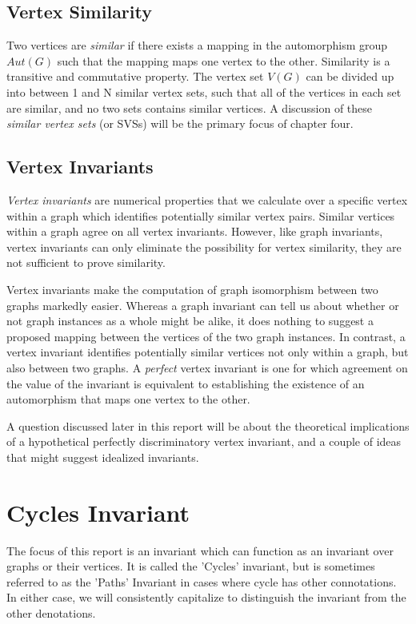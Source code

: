 \documentclass[11pt,a4paper]{report}
\begin{document}
\subsection{Vertex Similarity}
Two vertices are \emph{similar} if there exists a mapping in the automorphism group $Aut(G)$ such that the mapping maps one vertex to the other.
Similarity is a transitive and commutative property.
The vertex set $V(G)$ can be divided up into between 1 and N similar vertex sets, such that all of the vertices in each set are similar, and no two sets contains similar vertices.
A discussion of these \emph{similar vertex sets} (or SVSs) will be the primary focus of chapter four.

\subsection{Vertex Invariants}
\emph{Vertex invariants} are numerical properties that we  calculate over a specific vertex within a graph which identifies potentially similar vertex pairs.
Similar vertices within a graph agree on all vertex invariants.
However, like graph invariants, vertex invariants can only eliminate the possibility for vertex similarity, they are not sufficient to prove similarity.

Vertex invariants make the computation of graph isomorphism between two graphs markedly easier. 
Whereas a graph invariant can tell us about whether or not graph instances as a whole might be alike, it does nothing to suggest a proposed mapping between the vertices of the two graph instances.
In contrast, a vertex invariant identifies potentially similar vertices not only within a graph, but also between two graphs.
A \emph{perfect} vertex invariant is one for which agreement on the value of the invariant is equivalent to establishing the existence of an automorphism that maps one vertex to the other.

A question discussed later in this report will be about the theoretical implications of a hypothetical perfectly discriminatory vertex invariant, and a couple of ideas that might suggest idealized invariants.

\section{Cycles Invariant}
The focus of this report is an invariant which can function as an invariant over graphs or their vertices.
It is called the 'Cycles' invariant, but is sometimes referred to as the 'Paths' Invariant in cases where cycle has other connotations.
In either case, we will consistently capitalize to distinguish the invariant from the other denotations.
\end{document}
